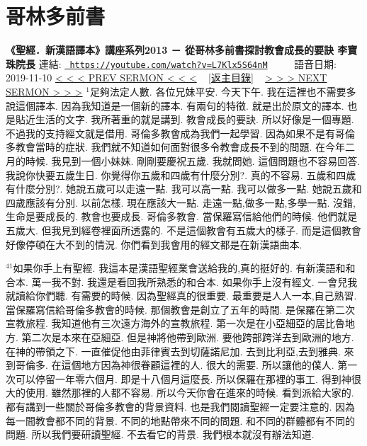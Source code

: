\documentclass{book}
\begin{document}
\section{哥林多前書}
\label{sec:L7Klx5S64nM}
\textbf{《聖經．新漢語譯本》講座系列2013 － 從哥林多前書探討教會成長的要訣 李寶珠院長}
\newline
\newline
連結: \href{https://youtube.com/watch?v=L7Klx5S64nM}{\texttt{ https://youtube.com/watch?v=L7Klx5S64nM}} ~~~~ 語音日期: 2019-11-10 
\newline
\newline
\hyperref[sec:9gWlq_OvVJU]{\small{< < < PREV SERMON < < <}}
~
\hyperref[sec:index]{\small{[返主目錄]}}
~
\hyperref[sec:WEwyO2xJwfc]{\small{> > > NEXT SERMON > > >}}
\newline
\newline
$^{1}$足夠法定人數.
各位兄妹平安.
今天下午.
我在這裡也不需要多說這個譯本.
因為我知道是一個新的譯本.
有兩句的特徵.
就是出於原文的譯本.
也是貼近生活的文字.
我所著重的就是講到.
教會成長的要訣.
所以好像是一個專題.
不過我的支持經文就是借用.
哥倫多教會成為我們一起學習.
因為如果不是有哥倫多教會當時的症狀.
我們就不知道如何面對很多令教會成長不到的問題.
在今年二月的時候.
我見到一個小妹妹.
剛剛要慶祝五歲.
我就問她.
這個問題也不容易回答.
我說你快要五歲生日.
你覺得你五歲和四歲有什麼分別?.
真的不容易.
五歲和四歲有什麼分別?.
她說五歲可以走遠一點.
我可以高一點.
我可以做多一點.
她說五歲和四歲應該有分別.
以前怎樣.
現在應該大一點.
走遠一點,做多一點,多學一點.
沒錯,生命是要成長的.
教會也要成長.
哥倫多教會.
當保羅寫信給他們的時候.
他們就是五歲大.
但我見到經卷裡面所透露的.
不是這個教會有五歲大的樣子.
而是這個教會好像停頓在大不到的情況.
你們看到我會用的經文都是在新漢語曲本.

$^{41}$如果你手上有聖經.
我這本是漢語聖經業會送給我的,真的挺好的.
有新漢語和和合本.
萬一我不對.
我還是看回我所熟悉的和合本.
如果你手上沒有經文.
一會兒我就讀給你們聽.
有需要的時候.
因為聖經真的很重要.
最重要是人人一本,自己熟習.
當保羅寫信給哥倫多教會的時候.
那個教會是創立了五年的時間.
是保羅在第二次宣教旅程.
我知道他有三次遠方海外的宣教旅程.
第一次是在小亞細亞的居比魯地方.
第二次是本來在亞細亞.
但是神將他帶到歐洲.
要他跨部跨洋去到歐洲的地方.
在神的帶領之下.
一直催促他由菲律賓去到切薩諾尼加.
去到比利亞,去到雅典.
來到哥倫多.
在這個地方因為神很眷顧這裡的人.
很大的需要.
所以讓他的僕人.
第一次可以停留一年零六個月.
即是十八個月這麼長.
所以保羅在那裡的事工.
得到神很大的使用.
雖然那裡的人都不容易.
所以今天你會在進來的時候.
看到派給大家的.
都有講到一些關於哥倫多教會的背景資料.
也是我們閱讀聖經一定要注意的.
因為每一間教會都不同的背景.
不同的地點帶來不同的問題.
和不同的群體都有不同的問題.
所以我們要研讀聖經.
不去看它的背景.
我們根本就沒有辦法知道.
\end{document}
